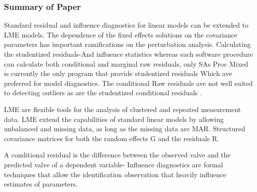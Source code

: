 \documentclass[12pt, a4paper]{report}
\theoremstyle{plain}
\theoremstyle{definition}
\theoremstyle{remark}
\begin{document}
	\subsubsection{Summary of Paper}
Standard residual and influence diagnostics for linear models can be extended to LME models. The dependence of the fixed effects solutions on the covariance parameters has important ramifications on the perturbation analysis. Calculating the studentized residuals-And influence statistics whereas each software procedure can calculate both conditional and marginal raw residuals, only SAs Proc Mixed is currently the only program that provide studentized residuals Which ave preferred for model diagnostics. The conditional Raw residuals ave not well suited to detecting outliers as are the studentized conditional residuals \citep{schabenberger}.
	
LME are flexible tools for the analysis of clustered and repeated measurement data. LME extend the capabilities of standard linear models by allowing unbalanced and missing data, as long as the missing data are MAR. Structured covariance matrices for both the random effects G and the residuals R. 

	
A conditional residual is the difference between the observed valve and the predicted valve of a dependent variable- Influence diagnostics are formal techniques that allow the identification observation that heavily influence estimates of parameters.


	
	
	
	
\end{document}
